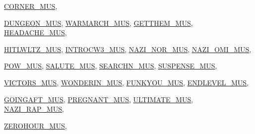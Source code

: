 \begin{DoxyCompactItemize}
\hyperlink{BUDIOWL6_8H_a196fbe29c4c02d90973f0b611ed0958ba6684c7cb5588da325ce5c249f6f1c73d}{CORNER\_\-MUS}, 
\par
\hyperlink{BUDIOWL6_8H_a196fbe29c4c02d90973f0b611ed0958baf2c309188a930d785b5bd872cdc8a25a}{DUNGEON\_\-MUS}, 
\hyperlink{BUDIOWL6_8H_a196fbe29c4c02d90973f0b611ed0958bace5622f33f6a408433b0b6297e5b105f}{WARMARCH\_\-MUS}, 
\hyperlink{BUDIOWL6_8H_a196fbe29c4c02d90973f0b611ed0958ba7e5c1b99c21692e63e02afdd5d86fcc3}{GETTHEM\_\-MUS}, 
\hyperlink{BUDIOWL6_8H_a196fbe29c4c02d90973f0b611ed0958ba8432ac5fc8bd91475629da629ec1f529}{HEADACHE\_\-MUS}, 
\par
\hyperlink{BUDIOWL6_8H_a196fbe29c4c02d90973f0b611ed0958baccac9d14a9d032582f554559d367a9cf}{HITLWLTZ\_\-MUS}, 
\hyperlink{BUDIOWL6_8H_a196fbe29c4c02d90973f0b611ed0958bab520829b8e6f5e6de689d6b72db40cc1}{INTROCW3\_\-MUS}, 
\hyperlink{BUDIOWL6_8H_a196fbe29c4c02d90973f0b611ed0958ba5dbdf2eda54a6dda47a79fda46b092e2}{NAZI\_\-NOR\_\-MUS}, 
\hyperlink{BUDIOWL6_8H_a196fbe29c4c02d90973f0b611ed0958baad2b095ea29bcfbfa15624151493269a}{NAZI\_\-OMI\_\-MUS}, 
\par
\hyperlink{BUDIOWL6_8H_a196fbe29c4c02d90973f0b611ed0958ba1140f70dfce3db4d83fe3038e18ff81b}{POW\_\-MUS}, 
\hyperlink{BUDIOWL6_8H_a196fbe29c4c02d90973f0b611ed0958bace3811a508aad122d09a980bb224eedc}{SALUTE\_\-MUS}, 
\hyperlink{BUDIOWL6_8H_a196fbe29c4c02d90973f0b611ed0958ba1e10f75019002e7b968d610c22a3e34e}{SEARCHN\_\-MUS}, 
\hyperlink{BUDIOWL6_8H_a196fbe29c4c02d90973f0b611ed0958baf8b8c2e5fd53c2af30daad5e3d760183}{SUSPENSE\_\-MUS}, 
\par
\hyperlink{BUDIOWL6_8H_a196fbe29c4c02d90973f0b611ed0958bab30bf66399f6dc92b90a0b8cae8f6c70}{VICTORS\_\-MUS}, 
\hyperlink{BUDIOWL6_8H_a196fbe29c4c02d90973f0b611ed0958ba68dd0b02bfbae87a0473618dc62c8162}{WONDERIN\_\-MUS}, 
\hyperlink{BUDIOWL6_8H_a196fbe29c4c02d90973f0b611ed0958bae5efd5502efe59f6bf2a135a2183f7b0}{FUNKYOU\_\-MUS}, 
\hyperlink{BUDIOWL6_8H_a196fbe29c4c02d90973f0b611ed0958ba2073820e6efb1330c3f9907a9c135032}{ENDLEVEL\_\-MUS}, 
\par
\hyperlink{BUDIOWL6_8H_a196fbe29c4c02d90973f0b611ed0958bab65a27c2d6582c4939998558e0a6fe72}{GOINGAFT\_\-MUS}, 
\hyperlink{BUDIOWL6_8H_a196fbe29c4c02d90973f0b611ed0958bae3b6626f0b3d16d6e7c20e4ec847786c}{PREGNANT\_\-MUS}, 
\hyperlink{BUDIOWL6_8H_a196fbe29c4c02d90973f0b611ed0958babf66e8d94ebad353f9601202c45f2acc}{ULTIMATE\_\-MUS}, 
\hyperlink{BUDIOWL6_8H_a196fbe29c4c02d90973f0b611ed0958baf40f1c797d64cdb1669d050bcad8df48}{NAZI\_\-RAP\_\-MUS}, 
\par
\hyperlink{BUDIOWL6_8H_a196fbe29c4c02d90973f0b611ed0958ba23bd2ae74596af28fba6d2359f7128ed}{ZEROHOUR\_\-MUS}, 

\end{DoxyCompactItemize}

